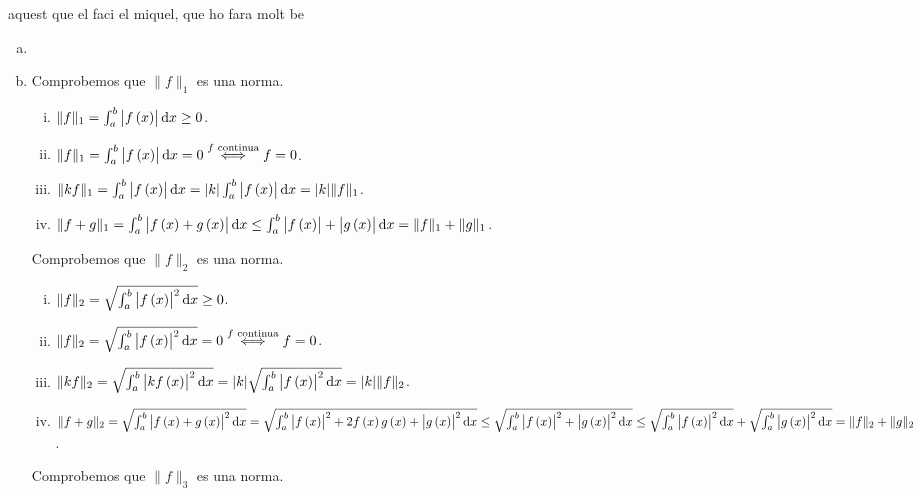 \begin{eje}
aquest que el faci el miquel, que ho fara molt be
\end{eje}

\begin{eje}
    \begin{enumerate}[(a)]
        \item[]
        \item Comprobemos que $\| f \|_1$ es una norma.
            \begin{enumerate}[i)]
                \item $\| f \|_1 =  \int_a^b \left| f \lp x \rp \right| \dif x \geq 0$.
                \item $\| f \|_1 =  \int_a^b \left| f \lp x \rp \right| \dif x = 0 \stackrel{f \text{ continua}}{\iff} f = 0$.
                \item $\| kf \|_1 =  \int_a^b \left| f \lp x \rp \right| \dif x = | k | \int_a^b \left| f \lp x \rp \right| \dif x = | k | \|f \|_1$.
                \item $\| f+g \|_1 =  \int_a^b \left| f \lp x \rp +g \lp x \rp \right| \dif x \leq \int_a^b \left| f\lp x \rp \right| + \left| g \lp x \rp \right| \dif x = \| f \| _1 + \| g \|_ 1 $.
            \end{enumerate}
            Comprobemos que $\| f \|_2$ es una norma.
            \begin{enumerate}[i)]
                \item $\| f \|_2 =  \sqrt{\int_a^b \left| f \lp x \rp \right|^2 \dif x } \geq 0$.
                \item $\| f \|_2 =  \sqrt{\int_a^b \left| f \lp x \rp \right|^2 \dif x} = 0 \stackrel{f \text{ continua}}{\iff} f = 0$.
                \item $\| kf \|_2 =  \sqrt{\int_a^b \left| kf \lp x \rp \right|^2 \dif x} = | k | \sqrt{\int_a^b \left| f \lp x \rp \right|^2 \dif x } = | k | \|f \|_2 $.
                \item $\| f+g \|_2 =  \sqrt{\int_a^b \left| f \lp x \rp +g \lp x \rp \right|^2 \dif x} = \sqrt{\int_a^b \left| f \lp x \rp \right|^2+2f \lp x \rp g \lp x \rp + \left| g \lp x \rp \right|^2 \dif x} \leq \sqrt{\int_a^b \left| f \lp x \rp \right|^2 + \left| g \lp x \rp \right|^2 \dif x} \leq \sqrt{\int_a^b \left| f \lp x \rp \right|^2 \dif x} + \sqrt{\int_a^b \left| g \lp x \rp \right|^2 \dif x} = \| f \| _2 + \| g \|_2 $.
            \end{enumerate}
            Comprobemos que $\| f \|_3$ es una norma.
            \begin{enumerate}[i)]

\end{enumerate}
\end{enumerate}
\end{eje}
